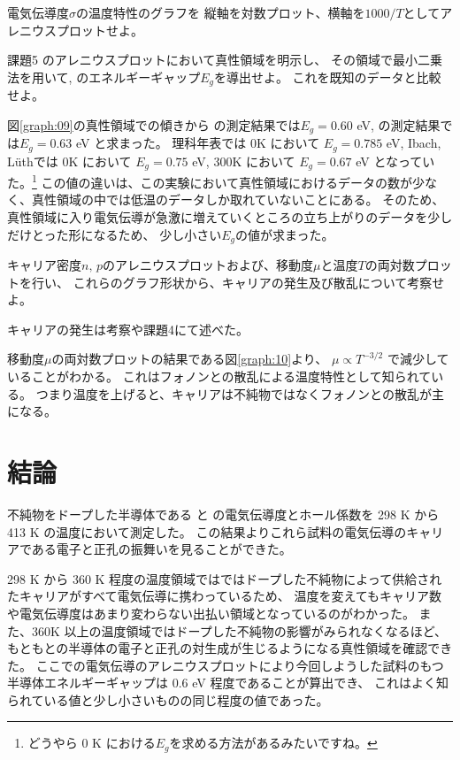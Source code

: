 \documentclass[11pt,dvipdfmx,a4paper]{jsarticle}
\numberwithin{equation}{section}
\begin{document}
\begin{tcolorbox}[title=課題5]
	電気伝導度\(\sigma\)の温度特性のグラフを
	縦軸を対数プロット、横軸を\(1000/T\)としてアレニウスプロットせよ。
\end{tcolorbox}
\begin{tcolorbox}[title=課題6]
	課題5 のアレニウスプロットにおいて真性領域を明示し、
	その領域で最小二乗法を用いて,  のエネルギーギャップ\(E_g\)を導出せよ。
	これを既知のデータと比較せよ。
\end{tcolorbox}
図\ref{graph:09}の真性領域での傾きから
の測定結果では\(E_g = 0.60\) eV,
の測定結果では\(E_g = 0.63\) eV と求まった。
理科年表\cite{rikanenpyo}では 0K において \(E_g = 0.785\) eV,
Ibach, L\"uth\cite{ibach-luth}では 0K において \(E_g = 0.75\) eV, 300K において \(E_g = 0.67\) eV
となっていた。\footnote{どうやら 0 K における\(E_g\)を求める方法があるみたいですね。}
この値の違いは、この実験において真性領域におけるデータの数が少なく、真性領域の中では低温のデータしか取れていないことにある。
そのため、真性領域に入り電気伝導が急激に増えていくところの立ち上がりのデータを少しだけとった形になるため、
少し小さい\(E_g\)の値が求まった。\\

\begin{tcolorbox}[title=課題7]
	キャリア密度\(n,\,p\)のアレニウスプロットおよび、移動度\(\mu\)と温度\(T\)の両対数プロットを行い、
	これらのグラフ形状から、キャリアの発生及び散乱について考察せよ。
\end{tcolorbox}
キャリアの発生は考察や課題4にて述べた。

移動度\(\mu\)の両対数プロットの結果である図\ref{graph:10}より、
\(\mu \propto T^{-3/2}\)
で減少していることがわかる。
これはフォノンとの散乱による温度特性として知られている\cite{ibach-luth}。
つまり温度を上げると、キャリアは不純物ではなくフォノンとの散乱が主になる。

\section{結論}
不純物をドープした半導体である と  の電気伝導度とホール係数を 298 K から 413 K の温度において測定した。
この結果よりこれら試料の電気伝導のキャリアである電子と正孔の振舞いを見ることができた。

298 K から 360 K 程度の温度領域ではではドープした不純物によって供給されたキャリアがすべて電気伝導に携わっているため、
温度を変えてもキャリア数や電気伝導度はあまり変わらない出払い領域となっているのがわかった。
また、360K 以上の温度領域ではドープした不純物の影響がみられなくなるほど、
もともとの半導体の電子と正孔の対生成が生じるようになる真性領域を確認できた。
ここでの電気伝導のアレニウスプロットにより今回しようした試料のもつ半導体エネルギーギャップは 0.6 eV 程度であることが算出でき、
これはよく知られている値と少し小さいものの同じ程度の値であった。




\end{document}
